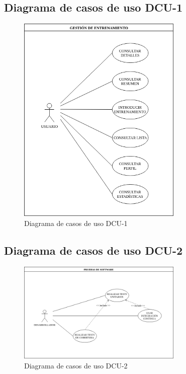 \subsection{Diagrama de casos de uso DCU-1 }
\begin{figure}[H]
  \begin{center}
    \includegraphics[width=0.7\textwidth]{imagenes/DCU-1.png}
    \caption{Diagrama de casos de uso DCU-1}
    \label{fig:DCU-1}
  \end{center}
\end{figure}
\subsection{Diagrama de casos de uso DCU-2 }
\begin{figure}[H]
  \begin{center}
    \includegraphics[width=0.7\textwidth]{imagenes/DCU-2.png}
    \caption{Diagrama de casos de uso DCU-2}
    \label{fig:DCU-2}
  \end{center}
\end{figure}
